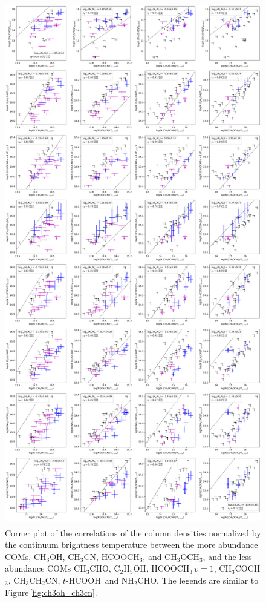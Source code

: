 \documentclass[twocolumn]{aastex62}
\newcommand{\methylformate}{\mbox{HCOOCH$_{3}$}}
\newcommand{\methylformatev}{\mbox{HCOOCH$_{3}$\,$v=1$}}
\newcommand{\methanol}{\mbox{CH$_{3}$OH}}
\newcommand{\dimethylether}{\mbox{CH$_{3}$OCH$_{3}$}}
\newcommand{\acetone}{\mbox{CH$_{3}$COCH$_{3}$}}
\newcommand{\ethanol}{\mbox{C$_{2}$H$_{5}$OH}}
\newcommand{\acetaldehyde}{\mbox{CH$_{3}$CHO}}
\newcommand{\ethylcyanide}{\mbox{CH$_{3}$CH$_{2}$CN}}
\newcommand{\methylcyanide}{\mbox{CH$_{3}$CN}}
\newcommand{\formamide}{\mbox{NH$_{2}$CHO}}
\newcommand{\thcooh}{\mbox{$t$-HCOOH}}
\begin{document}
\begin{figure}[htbp!]
  \centering
  \includegraphics[height=9in]{Ncol_major_minor.pdf}
  \caption{Corner plot of the correlations of the column densities normalized by the continuum brightness temperature between the more abundance COMs, \methanol, \methylcyanide, \methylformate, and \dimethylether, and the less abundance COMs \acetaldehyde, \ethanol, \methylformatev, \acetone, \ethylcyanide, \thcooh\, and \formamide.  The legends are similar to Figure\,\ref{fig:ch3oh_ch3cn}.}
  \label{fig:major_minor}
\end{figure}
\end{document}
